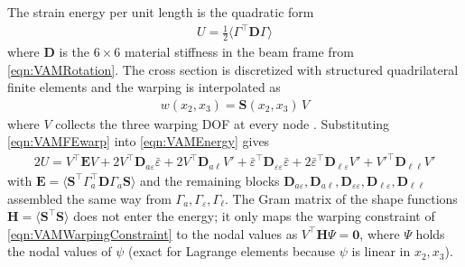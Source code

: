 \documentclass[10pt]{article}
\newcommand{\mbf}[1]{\mathbf{#1}}
\newcommand{\half}{\frac{1}{2}}
\newcommand{\beq}{\begin{equation}\begin{aligned}}
\newcommand{\eeq}{\end{aligned}\end{equation}}
\begin{document}
The strain energy per unit length is the quadratic form
\beq
U = \half \langle \Gamma^\top \mbf{D} \Gamma \rangle
\label{eqn:VAMEnergy}
\eeq
where $\mbf{D}$ is the $6\times6$ material stiffness in the beam frame from \autoref{eqn:VAMRotation}.
The cross section is discretized with structured quadrilateral finite elements and the warping is interpolated as
\beq
w(x_2,x_3) = \mbf{S}(x_2,x_3)\, V
\label{eqn:VAMFEwarp}
\eeq
where $V$ collects the three warping \ac{DOF} at every node \citep[Eqs.~(4.39)--(4.43)]{Hodges2006}.
Substituting \autoref{eqn:VAMFEwarp} into \autoref{eqn:VAMEnergy} gives
\beq
2U = V^\top \mbf{E} V + 2 V^\top \mbf{D}_{a\varepsilon} \bar\varepsilon + 2 V^\top \mbf{D}_{a\ell} V' + \bar\varepsilon^\top \mbf{D}_{\varepsilon\varepsilon} \bar\varepsilon + 2 \bar\varepsilon^\top \mbf{D}_{\ell\varepsilon} V' + V'^\top \mbf{D}_{\ell\ell} V'
\label{eqn:VAMQuadraticForm}
\eeq
with $\mbf{E} = \langle \mbf{S}^\top \Gamma_a^\top \mbf{D} \Gamma_a \mbf{S} \rangle$ and the remaining blocks $\mbf{D}_{a\varepsilon}, \mbf{D}_{a\ell}, \mbf{D}_{\varepsilon\varepsilon}, \mbf{D}_{\ell\varepsilon}, \mbf{D}_{\ell\ell}$ assembled the same way from $\Gamma_a, \Gamma_\varepsilon, \Gamma_\ell$.
The Gram matrix of the shape functions $\mbf{H} = \langle \mbf{S}^\top \mbf{S} \rangle$ does not enter the energy; it only maps the warping constraint of \autoref{eqn:VAMWarpingConstraint} to the nodal values as $V^\top \mbf{H}\Psi = \mbf{0}$, where $\Psi$ holds the nodal values of $\psi$ (exact for Lagrange elements because $\psi$ is linear in $x_2, x_3$).
\end{document}
